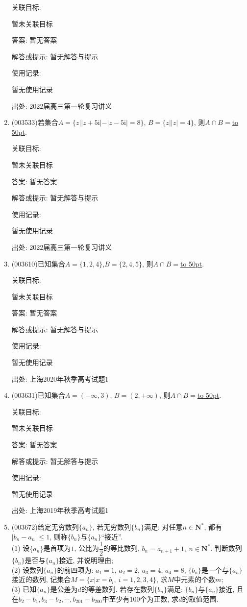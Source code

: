 \documentclass[10pt,a4paper]{article}
\newcommand{\blank}[1]{\underline{\hbox to #1pt{}}}
\begin{document}
\begin{enumerate}[1.]
关联目标:

暂未关联目标

答案: 暂无答案

解答或提示: 暂无解答与提示

使用记录:

暂无使用记录


出处: 2022届高三第一轮复习讲义
\item { (003533)}若集合$A=\{z||z+5\mathrm{i}|-|z-5\mathrm{i}|=8\}$, $B=\{z||z|=4\}$, 则$A\cap B=$\blank{50}.


关联目标:

暂未关联目标

答案: 暂无答案

解答或提示: 暂无解答与提示

使用记录:

暂无使用记录


出处: 2022届高三第一轮复习讲义
\item { (003610)}已知集合$A=\{1,2,4\}$,$B=\{2,4,5\}$, 则$A\cap B=$\blank{50}.


关联目标:

暂未关联目标

答案: 暂无答案

解答或提示: 暂无解答与提示

使用记录:

暂无使用记录


出处: 上海2020年秋季高考试题1
\item { (003631)}已知集合$A=(-\infty,3)$, $B=(2,+\infty)$, 则$A\cap B=$\blank{50}.


关联目标:

暂未关联目标

答案: 暂无答案

解答或提示: 暂无解答与提示

使用记录:

暂无使用记录


出处: 上海2019年秋季高考试题1
\item { (003672)}给定无穷数列$\{a_n\}$, 若无穷数列$\{b_n\}$满足: 对任意$n\in \mathbf{N}^*$, 都有$|b_n-a_n|\le 1$, 则称$\{b_n\}$与$\{a_n\}$``接近''.\\
(1) 设$\{a_n\}$是首项为$1$, 公比为$\dfrac{1}{2}$的等比数列, $b_n=a_{n+1}+1, \ n\in \mathbf{N}^*$. 判断数列$\{b_n\}$是否与$\{a_n\}$接近, 并说明理由;\\
(2) 设数列$\{a_n\}$的前四项为: $a_1=1$, $a_2=2$, $a_3=4$, $a_4=8$, $\{b_n\}$是一个与$\{a_n\}$接近的数列, 记集合$M=\{x|x=b_i, \ i=1,2,3,4\}$, 求$M$中元素的个数$m$;\\
(3) 已知$\{a_n\}$是公差为$d$的等差数列. 若存在数列$\{b_n\}$满足: $\{b_n\}$与$\{a_n\}$接近, 且在$b_2-b_1,b_3-b_2,\cdots,b_{201}-b_{200}$中至少有$100$个为正数, 求$d$的取值范围.



\end{enumerate}
\end{document}
